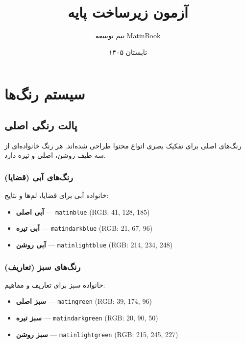 \documentclass{matinbook}
\title{آزمون زیرساخت پایه}
\author{تیم توسعه MatinBook}
\date{تابستان ۱۴۰۵}
\begin{document}
\maketitle

\chapter{سیستم رنگ‌ها}

\section{پالت رنگی اصلی}

رنگ‌های اصلی  برای تفکیک بصری انواع محتوا طراحی شده‌اند.
هر رنگ خانواده‌ای از سه طیف روشن، اصلی و تیره دارد.

\subsection{رنگ‌های آبی (قضایا)}

خانواده آبی برای قضایا، لم‌ها و نتایج:

\begin{itemize}
    \item \textcolor{matinblue}{\textbf{آبی اصلی}} --- \texttt{matinblue} (RGB: 41, 128, 185)
    \item \textcolor{matindarkblue}{\textbf{آبی تیره}} --- \texttt{matindarkblue} (RGB: 21, 67, 96)
    \item \colorbox{matinlightblue}{\textbf{آبی روشن}} --- \texttt{matinlightblue} (RGB: 214, 234, 248)
\end{itemize}

\subsection{رنگ‌های سبز (تعاریف)}

خانواده سبز برای تعاریف و مفاهیم:

\begin{itemize}
    \item \textcolor{matingreen}{\textbf{سبز اصلی}} --- \texttt{matingreen} (RGB: 39, 174, 96)
    \item \textcolor{matindarkgreen}{\textbf{سبز تیره}} --- \texttt{matindarkgreen} (RGB: 20, 90, 50)
    \item \colorbox{matinlightgreen}{\textbf{سبز روشن}} --- \texttt{matinlightgreen} (RGB: 215, 245, 227)
\end{itemize}
\end{document}
